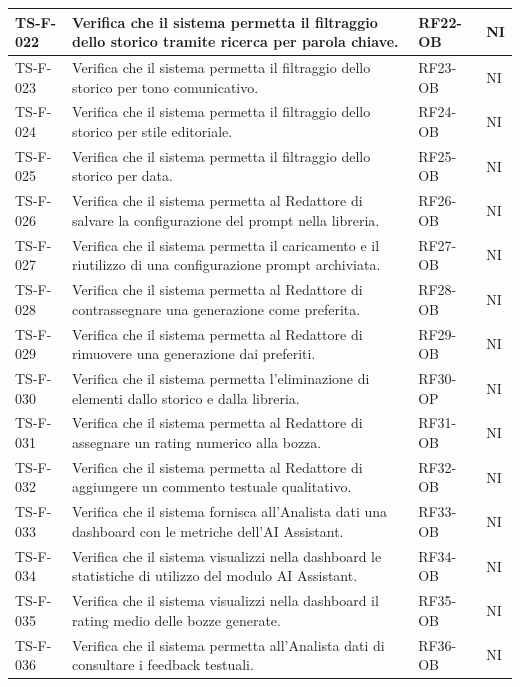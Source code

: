 \documentclass[a4paper,12pt]{article}
\begin{document}
\begin{longtable}{|p{2.2cm}|p{9.5cm}|p{2.3cm}|p{1.5cm}|}
    \hline
    TS-F-022 & Verifica che il sistema permetta il filtraggio dello storico tramite ricerca per parola chiave. & RF22-OB & NI \\
    \hline
    TS-F-023 & Verifica che il sistema permetta il filtraggio dello storico per tono comunicativo. & RF23-OB & NI \\
    \hline
    TS-F-024 & Verifica che il sistema permetta il filtraggio dello storico per stile editoriale. & RF24-OB & NI \\
    \hline
    TS-F-025 & Verifica che il sistema permetta il filtraggio dello storico per data. & RF25-OB & NI \\
    \hline
    TS-F-026 & Verifica che il sistema permetta al Redattore di salvare la configurazione del prompt nella libreria. & RF26-OB & NI \\
    \hline
    TS-F-027 & Verifica che il sistema permetta il caricamento e il riutilizzo di una configurazione prompt archiviata. & RF27-OB & NI \\
    \hline
    TS-F-028 & Verifica che il sistema permetta al Redattore di contrassegnare una generazione come preferita. & RF28-OB & NI \\
    \hline
    TS-F-029 & Verifica che il sistema permetta al Redattore di rimuovere una generazione dai preferiti. & RF29-OB & NI \\
    \hline
    TS-F-030 & Verifica che il sistema permetta l'eliminazione di elementi dallo storico e dalla libreria. & RF30-OP & NI \\
    \hline
    TS-F-031 & Verifica che il sistema permetta al Redattore di assegnare un rating numerico alla bozza. & RF31-OB & NI \\
    \hline
    TS-F-032 & Verifica che il sistema permetta al Redattore di aggiungere un commento testuale qualitativo. & RF32-OB & NI \\
    \hline
    TS-F-033 & Verifica che il sistema fornisca all'Analista dati una dashboard con le metriche dell'AI Assistant. & RF33-OB & NI \\
    \hline
    TS-F-034 & Verifica che il sistema visualizzi nella dashboard le statistiche di utilizzo del modulo AI Assistant. & RF34-OB & NI \\
    \hline
    TS-F-035 & Verifica che il sistema visualizzi nella dashboard il rating medio delle bozze generate. & RF35-OB & NI \\
    \hline
    TS-F-036 & Verifica che il sistema permetta all'Analista dati di consultare i feedback testuali. & RF36-OB & NI \\

\end{longtable}
\end{document}
